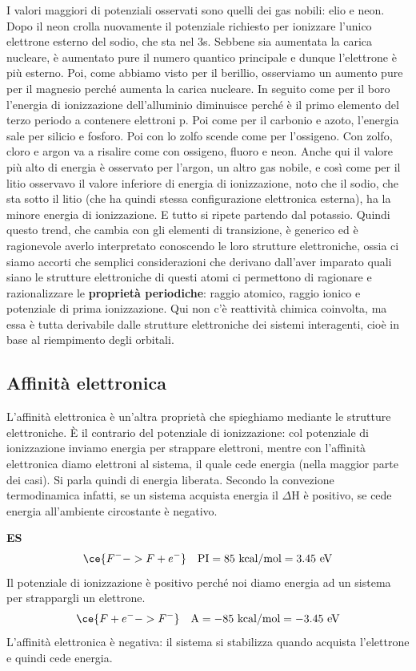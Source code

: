 I valori maggiori di potenziali osservati sono quelli dei gas nobili: elio e neon. Dopo il neon crolla nuovamente il potenziale richiesto per ionizzare l'unico elettrone esterno del sodio, che sta nel 3s. Sebbene sia aumentata la carica nucleare, è aumentato pure il numero quantico principale e dunque l'elettrone è più esterno. Poi, come abbiamo visto per il berillio, osserviamo un aumento pure per il magnesio perché aumenta la carica nucleare. In seguito come per il boro l'energia di ionizzazione dell'alluminio diminuisce perché è il primo elemento del terzo periodo a contenere elettroni p. Poi come per il carbonio e azoto, l'energia sale per silicio e fosforo. Poi con lo zolfo scende come per l'ossigeno. Con zolfo, cloro e argon va a risalire come con ossigeno, fluoro e neon. Anche qui il valore più alto di energia è osservato per l'argon, un altro gas nobile, e così come per il litio osservavo il valore inferiore di energia di ionizzazione, noto che il sodio, che sta sotto il litio (che ha quindi stessa configurazione elettronica esterna), ha la minore energia di ionizzazione. E tutto si ripete partendo dal potassio.
Quindi questo trend, che cambia con gli elementi di transizione, è generico ed è ragionevole averlo interpretato conoscendo le loro strutture elettroniche, ossia ci siamo accorti che semplici considerazioni che derivano dall'aver imparato quali siano le strutture elettroniche di questi atomi ci permettono di ragionare e razionalizzare le \textbf{proprietà periodiche}: raggio atomico, raggio ionico e potenziale di prima ionizzazione. 
Qui non c'è reattività chimica coinvolta, ma essa è tutta derivabile dalle strutture elettroniche dei sistemi interagenti, cioè in base al riempimento degli orbitali.
\subsection{Affinità elettronica}
L'affinità elettronica è un'altra proprietà che spieghiamo mediante le strutture elettroniche. È il contrario del potenziale di ionizzazione: col potenziale di ionizzazione inviamo energia per strappare elettroni, mentre con l'affinità elettronica diamo elettroni al sistema, il quale cede energia (nella maggior parte dei casi). Si parla quindi di energia liberata. Secondo la convezione termodinamica infatti, se un sistema acquista energia il $\Delta$H è positivo, se cede energia all'ambiente circostante è negativo. 

\textbf{ES}
$$\ce{ F^- -> F + e^-}\quad \text{PI} = 85\,\,\text{kcal}/\text{mol}=3.45 \text{ eV}$$
Il potenziale di ionizzazione è positivo perché noi diamo energia ad un sistema per strappargli un elettrone.
$$\ce{ F + e^- -> F^-}\quad \text{A} =-85\,\,\text{kcal}/\text{mol}=-3.45 \text{ eV}$$
L'affinità elettronica è negativa: il sistema si stabilizza quando acquista l'elettrone e quindi cede energia.


